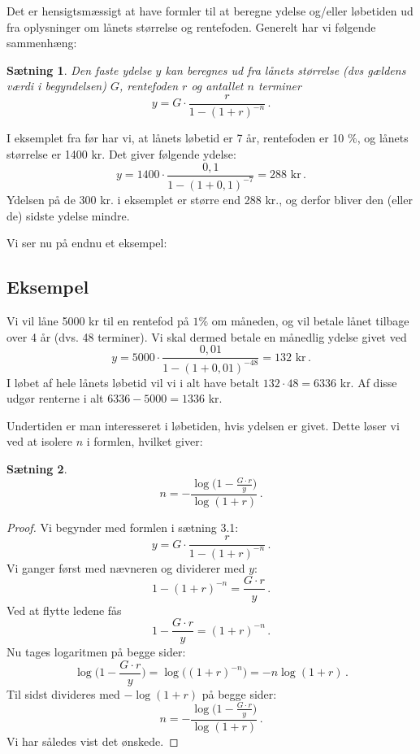 \documentclass[12pt,oneside,a4paper]{article}
\newtheorem{thm}{Sætning}[section]
\begin{document}
Det er hensigtsmæssigt at have formler til at beregne ydelse og/eller løbetiden
ud fra oplysninger om lånets størrelse og rentefoden.  Generelt har vi følgende
sammenhæng:

\begin{tcolorbox}
\begin{thm}
Den faste ydelse $y$ kan beregnes ud fra lånets størrelse (dvs gældens
værdi i begyndelsen) $G$, rentefoden $r$ og antallet $n$ terminer
\[
    y = G\cdot\frac{r}{1-(1+r)^{-n}}\,.
\]
\end{thm}
\end{tcolorbox}

I eksemplet fra før har vi, at lånets løbetid er 7 år, rentefoden er 10 $\%$, og
lånets størrelse er 1400 kr. Det giver følgende ydelse:
\[
y = 1400\cdot\frac{0,1}{1-(1+0,1)^{-7}} = 288 \,\,\mbox{kr}\,.
\]
Ydelsen på de 300 kr. i eksemplet er større end 288 kr., og derfor bliver den
(eller de) sidste ydelse mindre.

Vi ser nu på endnu et eksempel:
\begin{tcolorbox}
\subsection*{Eksempel}
Vi vil låne 5000 kr til en rentefod på $1 \%$ om måneden, og vil betale lånet
tilbage over 4 år (dvs. 48 terminer).  Vi skal dermed betale en månedlig
ydelse givet ved
\[
    y = 5000\cdot\frac{0,01}{1-(1+0,01)^{-48}} = 132 \,\,\mbox {kr} \,. 
\]
I løbet af hele lånets løbetid vil vi i alt have betalt $132\cdot 48 = 6336$ kr. Af
disse udgør renterne i alt $6336-5000 = 1336$ kr.
\end{tcolorbox}

Undertiden er man interesseret i løbetiden, hvis ydelsen er givet.
Dette løser vi ved at isolere $n$ i formlen, hvilket giver:
\begin{tcolorbox}
\begin{thm}
\[
    n = -\frac{\log\big(1-\frac{G\cdot r}{y}\big)}{\log(1+r)} \,.
\]
\end{thm}
\begin{proof}
Vi begynder med formlen i sætning 3.1:
\[
    y = G\cdot\frac{r}{1-(1+r)^{-n}}\,.
\]
Vi ganger først med nævneren og dividerer med $y$:
\[
1-(1+r)^{-n} = \frac{G\cdot r}{y}\,.
\]
Ved at flytte ledene fås
\[
1 - \frac{G\cdot r}{y} =(1+r)^{-n}\,.
\]
Nu tages logaritmen på begge sider:
\[
\log\Big(1 - \frac{G\cdot r}{y}\Big) =\log\Big((1+r)^{-n}\Big) = -n\log(1+r)\,.
\]
Til sidst divideres med $-\log(1+r)$ på begge sider:
\[
n = -\frac{\log\big(1-\frac{G\cdot r}{y}\big)}{\log(1+r)} \,.
\]
Vi har således vist det ønskede.
\end{proof}
\end{tcolorbox}
\end{document}
